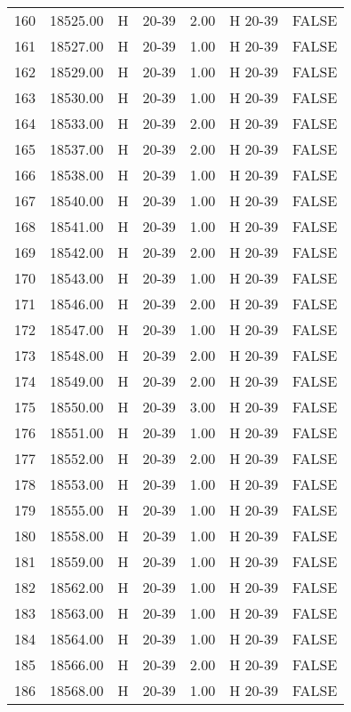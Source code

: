 \begin{table}[ht]
\begin{tabular}{rrllrll}
  160 & 18525.00 & H & 20-39 & 2.00 & H 20-39 & FALSE \\ 
  161 & 18527.00 & H & 20-39 & 1.00 & H 20-39 & FALSE \\ 
  162 & 18529.00 & H & 20-39 & 1.00 & H 20-39 & FALSE \\ 
  163 & 18530.00 & H & 20-39 & 1.00 & H 20-39 & FALSE \\ 
  164 & 18533.00 & H & 20-39 & 2.00 & H 20-39 & FALSE \\ 
  165 & 18537.00 & H & 20-39 & 2.00 & H 20-39 & FALSE \\ 
  166 & 18538.00 & H & 20-39 & 1.00 & H 20-39 & FALSE \\ 
  167 & 18540.00 & H & 20-39 & 1.00 & H 20-39 & FALSE \\ 
  168 & 18541.00 & H & 20-39 & 1.00 & H 20-39 & FALSE \\ 
  169 & 18542.00 & H & 20-39 & 2.00 & H 20-39 & FALSE \\ 
  170 & 18543.00 & H & 20-39 & 1.00 & H 20-39 & FALSE \\ 
  171 & 18546.00 & H & 20-39 & 2.00 & H 20-39 & FALSE \\ 
  172 & 18547.00 & H & 20-39 & 1.00 & H 20-39 & FALSE \\ 
  173 & 18548.00 & H & 20-39 & 2.00 & H 20-39 & FALSE \\ 
  174 & 18549.00 & H & 20-39 & 2.00 & H 20-39 & FALSE \\ 
  175 & 18550.00 & H & 20-39 & 3.00 & H 20-39 & FALSE \\ 
  176 & 18551.00 & H & 20-39 & 1.00 & H 20-39 & FALSE \\ 
  177 & 18552.00 & H & 20-39 & 2.00 & H 20-39 & FALSE \\ 
  178 & 18553.00 & H & 20-39 & 1.00 & H 20-39 & FALSE \\ 
  179 & 18555.00 & H & 20-39 & 1.00 & H 20-39 & FALSE \\ 
  180 & 18558.00 & H & 20-39 & 1.00 & H 20-39 & FALSE \\ 
  181 & 18559.00 & H & 20-39 & 1.00 & H 20-39 & FALSE \\ 
  182 & 18562.00 & H & 20-39 & 1.00 & H 20-39 & FALSE \\ 
  183 & 18563.00 & H & 20-39 & 1.00 & H 20-39 & FALSE \\ 
  184 & 18564.00 & H & 20-39 & 1.00 & H 20-39 & FALSE \\ 
  185 & 18566.00 & H & 20-39 & 2.00 & H 20-39 & FALSE \\ 
  186 & 18568.00 & H & 20-39 & 1.00 & H 20-39 & FALSE \\ 

\end{tabular}
\end{table}
